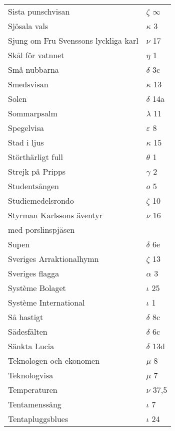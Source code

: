 \documentclass[a6paper,10pt]{article}
\begin{document}
\newpage
\begin{table}[!h]
\begin{tabular}{l l}
Sista punschvisan	&$\zeta$ $\infty$\\
Sjösala vals	&$\kappa$ 3\\
Sjung om Fru Svenssons lyckliga karl&	$\nu$ 17\\
Skål för vatnnet&	$\eta$ 1\\
Små nubbarna&	$\delta$ 3c\\
Smedsvisan	&$\kappa$ 13\\
Solen	&$\delta$ 14a\\
Sommarpsalm	&$\lambda$ 11\\
Spegelvisa&	$\varepsilon$ 8\\
Stad i ljus&       $\kappa$ 15\\
Störthärligt full&	$\theta$ 1\\
Strejk på Pripps&	$\gamma$ 2\\
Studentsången&	$o$ 5\\
Studiemedelsrondo&$\zeta$ 10\\
Styrman Karlssons äventyr &$\nu$ 16\\
med porslinspjäsen	&\\
Supen	&$\delta$ 6e\\
Sveriges Arraktionalhymn	&$\zeta$ 13\\
Sveriges flagga	&$\alpha$ 3\\
Système Bolaget&	$\iota$ 25\\
Système International&	$\iota$ 1\\
Så hastigt	&$\delta$ 8c\\
Sädesfälten	&$\delta$ 6c\\
Sänkta Lucia	&$\delta$ 13d\\
Teknologen och ekonomen&$\mu$ 8\\
Teknologvisa	&$\mu$ 7\\
Temperaturen	&$\nu$ 37,5\\
Tentamenssång&	$\iota$ 7\\
Tentapluggsblues&$\iota$ 24\\
\end{tabular}
\end{table}
\end{document}
